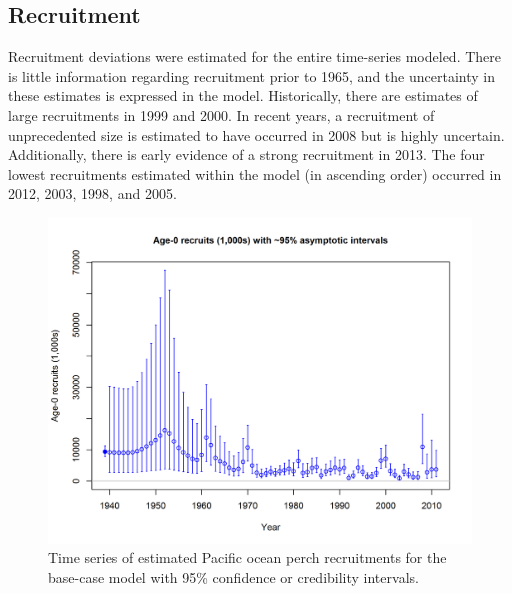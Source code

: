 \documentclass[12pt,]{article}
\begin{document}
\FloatBarrier

\subsection*{Recruitment}\label{recruitment}

Recruitment deviations were estimated for the entire time-series
modeled. There is little information regarding recruitment prior to
1965, and the uncertainty in these estimates is expressed in the model.
Historically, there are estimates of large recruitments in 1999 and
2000. In recent years, a recruitment of unprecedented size is estimated
to have occurred in 2008 but is highly uncertain. Additionally, there is
early evidence of a strong recruitment in 2013. The four lowest
recruitments estimated within the model (in ascending order) occurred in
2012, 2003, 1998, and 2005.

\begin{figure}
\centering
\includegraphics{r4ss/plots_mod1/ts11_Age-0_recruits_(1000s)_with_95_asymptotic_intervals.png}
\caption{Time series of estimated Pacific ocean perch recruitments for
the base-case model with 95\% confidence or credibility intervals.
\label{fig:Recruits_all}}
\end{figure}
\end{document}
